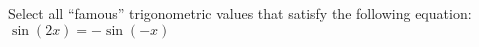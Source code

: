 \documentclass{ximera}
\author{David Kish}
\begin{document}
\begin{exercise}
Select all ``famous'' trigonometric values that satisfy the following equation:\\
$\sin(2x) = -\sin(-x)$ \\
\begin{selectAll}
\choice{$\pi$}
\end{selectAll}
\end{exercise}
\end{document}
